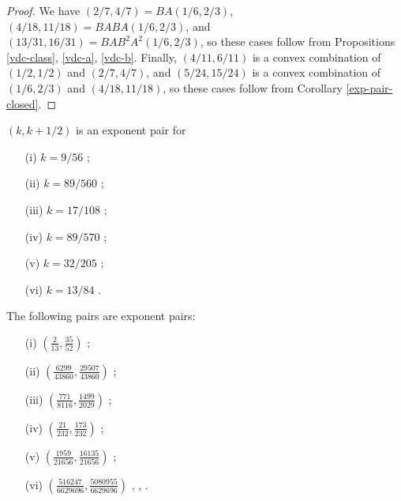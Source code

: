 \begin{proof} We have $(2/7,4/7) = BA(1/6,2/3)$, $(4/18,11/18) = BABA(1/6,2/3)$, and $(13/31, 16/31)=BAB^2A^2(1/6,2/3)$, so these cases follow from Propositions \ref{vdc-class}, \ref{vdc-a}, \ref{vdc-b}. Finally, $(4/11,6/11)$ is a convex combination of $(1/2,1/2)$ and $(2/7,4/7)$, and $(5/24, 15/24)$ is a convex combination of $(1/6,2/3)$ and $(4/18, 11/18)$, so these cases follow from Corollary \ref{exp-pair-closed}.
\end{proof}


\begin{theorem}\label{line-sym} $(k,k+1/2)$ is an exponent pair for
\begin{itemize}
\item[(i)] $k = 9/56$ \cite[Theorem~1]{huxley_exponential_1988};
\item[(ii)] $k=89/560$ \cite[Theorem~6]{watt_exponential_1989};
\item[(iii)] $k=17/108$ \cite[p. 467]{huxley_exponential_1991};
\item[(iv)] $k=89/570$ \cite[p. 40]{huxley_exponential_1993};
\item[(v)] $k=32/205$ \cite[Theorem~1]{huxley_exponential_2005};
\item[(vi)] $k=13/84$ \cite[p. 206]{bourgain_decoupling_2017}.
\end{itemize}
\end{theorem}

\literature
{}


\begin{theorem}\label{exp_pair_bombieri-iwaniec}  The following pairs are exponent pairs:
\begin{itemize}
\item[(i)] $(\frac{2}{13}, \frac{35}{52})$ \cite{huxley_watt_exponential_1990};
\item[(ii)] $(\frac{6299}{43860}, \frac{29507}{43860})$ \cite[Table 17.3]{huxley_area_1996};
\item[(iii)] $(\frac{771}{8116}, \frac{1499}{2029})$ \cite[p. 285]{sargos_points_1995};
\item[(iv)] $(\frac{21}{232}, \frac{173}{232})$ \cite[p. 286]{sargos_points_1995};
\item[(v)] $(\frac{1959}{21656}, \frac{16135}{21656})$ \cite[p. 286]{sargos_points_1995};
\item[(vi)] $(\frac{516247}{6629696}, \frac{5080955}{6629696})$ \cite{huxley_exponential_2001}, \cite[Table 19.2]{huxley_area_1996}, \cite{robert_fourth_2002}.
\end{itemize}
\end{theorem}

